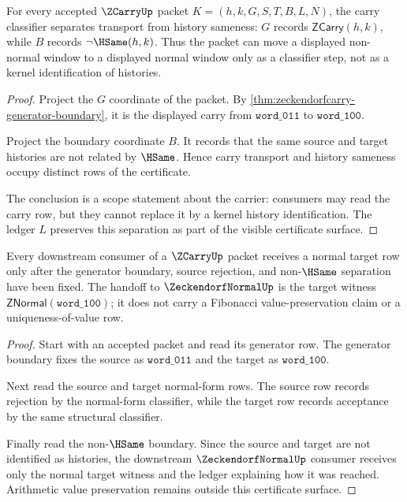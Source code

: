 \begin{theorem}
\label{thm:zeckendorfcarry-non-hsame-boundary}
For every accepted $\ZCarryUp$ packet $K=(h,k,G,S,T,B,L,N)$, the carry classifier separates transport from history sameness: $G$ records $\mathsf{ZCarry}(h,k)$, while $B$ records $\neg\HSame(h,k)$. Thus the packet can move a displayed non-normal window to a displayed normal window only as a classifier step, not as a kernel identification of histories.
\end{theorem}
\begin{proof}
Project the $G$ coordinate of the packet. By \autoref{thm:zeckendorfcarry-generator-boundary}, it is the displayed carry from $\mathtt{word\_011}$ to $\mathtt{word\_100}$.

Project the boundary coordinate $B$. It records that the same source and target histories are not related by $\HSame$. Hence carry transport and history sameness occupy distinct rows of the certificate.

The conclusion is a scope statement about the carrier: consumers may read the carry row, but they cannot replace it by a kernel history identification. The ledger $L$ preserves this separation as part of the visible certificate surface.
\end{proof}

\begin{theorem}
\label{thm:zeckendorfcarry-normal-target-handoff}
Every downstream consumer of a $\ZCarryUp$ packet receives a normal target row only after the generator boundary, source rejection, and non-$\HSame$ separation have been fixed. The handoff to $\ZeckendorfNormalUp$ is the target witness $\mathsf{ZNormal}(\mathtt{word\_100})$; it does not carry a Fibonacci value-preservation claim or a uniqueness-of-value row.
\end{theorem}
\begin{proof}
Start with an accepted packet and read its generator row. The generator boundary fixes the source as $\mathtt{word\_011}$ and the target as $\mathtt{word\_100}$.

Next read the source and target normal-form rows. The source row records rejection by the normal-form classifier, while the target row records acceptance by the same structural classifier.

Finally read the non-$\HSame$ boundary. Since the source and target are not identified as histories, the downstream $\ZeckendorfNormalUp$ consumer receives only the normal target witness and the ledger explaining how it was reached. Arithmetic value preservation remains outside this certificate surface.
\end{proof}


